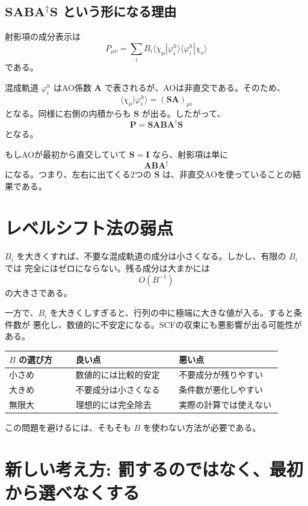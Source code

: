 \documentclass[uplatex,dvipdfmx,11pt]{jsarticle}
\newcommand{\Smat}{\mathbf S}
\newcommand{\Amat}{\mathbf A}
\newcommand{\Bmat}{\mathbf B}
\begin{document}
\subsection{\(\Smat\Amat\Bmat\Amat^\dagger\Smat\) という形になる理由}

射影項の成分表示は
\[
  P_{\mu\nu}
  =
  \sum_i B_i
  \langle \chi_\mu | \varphi_i^h \rangle
  \langle \varphi_i^h | \chi_\nu \rangle
\]
である。

混成軌道 \(\varphi_i^h\) はAO係数 \(\Amat\) で表されるが、AOは非直交である。そのため、
\[
  \langle \chi_\mu | \varphi_i^h \rangle
  =
  (\Smat\Amat)_{\mu i}
\]
となる。同様に右側の内積からも \(\Smat\) が出る。したがって、
\[
  \mathbf P = \Smat\Amat\Bmat\Amat^\dagger\Smat
\]
となる。

もしAOが最初から直交していて \(\Smat=\mathbf I\) なら、射影項は単に
\[
  \Amat\Bmat\Amat^\dagger
\]
になる。つまり、左右に出てくる2つの \(\Smat\) は、非直交AOを使っていることの結果である。

\section{レベルシフト法の弱点}

\(B_i\) を大きくすれば、不要な混成軌道の成分は小さくなる。しかし、有限の \(B_i\) では
完全にはゼロにならない。残る成分は大まかには
\[
  O(B^{-1})
\]
の大きさである。

一方で、\(B_i\) を大きくしすぎると、行列の中に極端に大きな値が入る。すると条件数が
悪化し、数値的に不安定になる。SCFの収束にも悪影響が出る可能性がある。

\begin{center}
\begin{tabular}{|p{0.22\linewidth}|p{0.34\linewidth}|p{0.34\linewidth}|}
\hline
\textbf{\(B\) の選び方} & \textbf{良い点} & \textbf{悪い点} \\
\hline
小さめ & 数値的には比較的安定 & 不要成分が残りやすい \\
\hline
大きめ & 不要成分は小さくなる & 条件数が悪化しやすい \\
\hline
無限大 & 理想的には完全除去 & 実際の計算では使えない \\
\hline
\end{tabular}
\end{center}

この問題を避けるには、そもそも \(B\) を使わない方法が必要である。

\section{新しい考え方: 罰するのではなく、最初から選べなくする}
\end{document}
